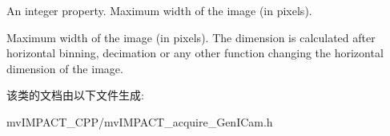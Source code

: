 An integer property. Maximum width of the image (in pixels). 

Maximum width of the image (in pixels). The dimension is calculated after horizontal binning, decimation or any other function changing the horizontal dimension of the image. 

该类的文档由以下文件生成\+:\begin{DoxyCompactItemize}
\item 
mv\+I\+M\+P\+A\+C\+T\+\_\+\+C\+P\+P/mv\+I\+M\+P\+A\+C\+T\+\_\+acquire\+\_\+\+Gen\+I\+Cam.\+h\end{DoxyCompactItemize}
